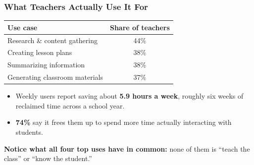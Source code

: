 \begin{frame}[fragile]\frametitle{What Teachers Actually Use It For}

\begin{center}
\renewcommand{\arraystretch}{1.4}
\begin{tabular}{|l|c|}
\hline
\textbf{Use case} & \textbf{Share of teachers} \\
\hline
Research \& content gathering & 44\% \\
Creating lesson plans & 38\% \\
Summarizing information & 38\% \\
Generating classroom materials & 37\% \\
\hline
\end{tabular}
\end{center}

\medskip
\begin{itemize}
\item Weekly users report saving about \textbf{5.9 hours a week}, roughly six weeks of reclaimed time across a school year.
\item \textbf{74\%} say it frees them up to spend more time actually interacting with students.
\end{itemize}

\medskip
\textbf{Notice what all four top uses have in common:} none of them is ``teach the class'' or ``know the student.''

\end{frame}
